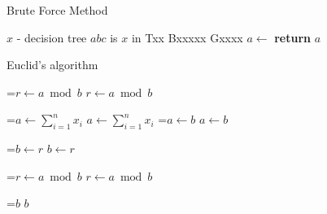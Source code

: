 \documentclass[10pt]{article}
\newcommand*{\thealgruleheight}{.75\baselineskip}
\newcommand*{\thealgruledepth}{.25\baselineskip}
\newcommand{\myState}[1]{%
    \setbox\statebox=\vbox{#1}%
    \edef\thealgruleheight{\dimexpr \the\ht\statebox+1pt\relax}%
    \edef\thealgruledepth{\dimexpr \the\dp\statebox+1pt\relax}%
    \ifdim\thealgruleheight<.75\baselineskip
        \def\thealgruleheight{\dimexpr .75\baselineskip+1pt\relax}%
    \fi
    \ifdim\thealgruledepth<.25\baselineskip
        \def\thealgruledepth{\dimexpr .25\baselineskip+1pt\relax}%
    \fi
    \State #1%
    \def\thealgruleheight{\dimexpr .75\baselineskip+1pt\relax}%
    \def\thealgruledepth{\dimexpr .25\baselineskip+1pt\relax}%
}
\begin{document}
\begin{fullwidth}[width=\linewidth+4cm,leftmargin=-2cm,rightmargin=-2cm]
\begin{algorithm}[H]
  \caption{Brute Force Method}
  \begin{algorithmic}[1]
    \Require $x$ - decision tree
    \Ensure $abc$ is $x$ in Txx Bxxxxx Gxxxx
      \State $a\gets$  
      \State \textbf{return} $a$ 
  \EndProcedure
  \end{algorithmic}
\end{algorithm}



\begin{algorithm}[H]
  \caption{Euclid’s algorithm}\label{euclid}
  \begin{algorithmic}[1]
      \myState{$r\gets a\bmod b$}
        \myState{$a\gets\displaystyle\sum_{i=1}^n x_i$}
        \myState{$a\gets b$}
        \myState{$b\gets r$}
        \myState{$r\gets a\bmod b$}
      \EndWhile\label{euclidendwhile}
      \myState{\Return $b$}
    \EndProcedure
  \end{algorithmic}
\end{algorithm}


\end{fullwidth}
\end{document}
